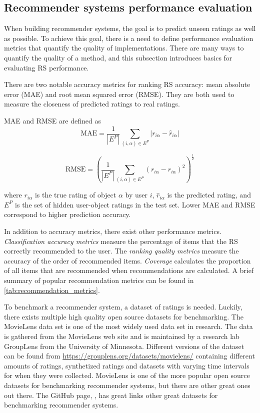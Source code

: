 \documentclass[english, 12pt, a4paper, sci, utf8, a-2b, online]{aaltothesis}
\begin{document}
\subsection{Recommender systems performance evaluation}
\label{subsec:performance_evaluation}

When building recommender systems, the goal is to predict unseen ratings as well as possible. To achieve this goal, there is a need to define performance evaluation metrics that quantify the quality of implementations. There are many ways to quantify the quality of a method, and this subsection introduces basics for evaluating RS performance.

There are two notable accuracy metrics for ranking RS accuracy: mean absolute error (MAE) and root mean squared error (RMSE). They are both used to measure the closeness of predicted ratings to real ratings.

MAE and RMSE are defined as 
\[
    \text{MAE} = \frac{1}{|E^P|}\sum_{(i,\alpha)\in E^P}|r_{i\alpha} - \hat{r}_{i\alpha}|
\]

\[
    \text{RMSE} = \left(\frac{1}{|E^P|}\sum_{(i,\alpha)\in E^P}(r_{i\alpha} - \hat{r}_{i\alpha})^2\right)^{\frac{1}{2}}
\]

where $r_{i\alpha}$ is the true rating of object $\alpha$ by user $i$, $\hat{r}_{i\alpha}$ is the predicted rating, and $E^P$ is the set of hidden user-object ratings in the test set. Lower MAE and RMSE correspond to higher prediction accuracy.

In addition to accuracy metrics, there exist other performance metrics. \textit{Classification accuracy metrics} measure the percentage of items that the RS correctly recommended to the user. The \textit{ranking quality metrics} measure the accuracy of the order of recommended items. \textit{Coverage} calculates the proportion of all items that are recommended when recommendations are calculated. A brief summary of popular recommendation metrics can be found in \autoref{tab:recommendation_metrics}.



To benchmark a recommender system, a dataset of ratings is needed. Luckily, there exists multiple high quality open source datasets for benchmarking. The MovieLens data set is one of the most widely used data set in research. The data is gathered from the MovieLens web site and is maintained by a research lab GroupLens from the University of Minnesota. Different versions of the dataset can be found from \url{https://grouplens.org/datasets/movielens/} containing different amounts of ratings, synthetized ratings and datasets with varying time intervals for when they were collected. MovieLens is one of the more popular open source datasets for benchmarking recommender systems, but there are other great ones out there. The GitHub page, \parencite{costa2024datasets}, has great links other great datasets for benchmarking recommender systems.
\end{document}
